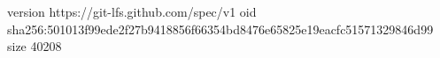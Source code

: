 version https://git-lfs.github.com/spec/v1
oid sha256:501013f99ede2f27b9418856f66354bd8476e65825e19eacfc51571329846d99
size 40208

